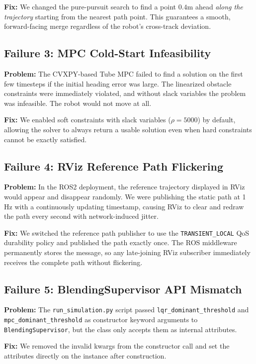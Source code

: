 \documentclass[12pt, a4paper]{article}
\begin{document}
\textbf{Fix:} We changed the pure-pursuit search to find a point $0.4$m ahead \emph{along the trajectory} starting from the nearest path point. This guarantees a smooth, forward-facing merge regardless of the robot's cross-track deviation.

\subsection{Failure 3: MPC Cold-Start Infeasibility}
\textbf{Problem:} The CVXPY-based Tube MPC failed to find a solution on the first few timesteps if the initial heading error was large. The linearized obstacle constraints were immediately violated, and without slack variables the problem was infeasible. The robot would not move at all.

\textbf{Fix:} We enabled soft constraints with slack variables ($\rho = 5000$) by default, allowing the solver to always return a usable solution even when hard constraints cannot be exactly satisfied.

\subsection{Failure 4: RViz Reference Path Flickering}
\textbf{Problem:} In the ROS2 deployment, the reference trajectory displayed in RViz would appear and disappear randomly. We were publishing the static path at 1 Hz with a continuously updating timestamp, causing RViz to clear and redraw the path every second with network-induced jitter.

\textbf{Fix:} We switched the reference path publisher to use the \texttt{TRANSIENT\_LOCAL} QoS durability policy and published the path exactly once. The ROS middleware permanently stores the message, so any late-joining RViz subscriber immediately receives the complete path without flickering.

\subsection{Failure 5: BlendingSupervisor API Mismatch}
\textbf{Problem:} The \texttt{run\_simulation.py} script passed \texttt{lqr\_dominant\_threshold} and \texttt{mpc\_dominant\_threshold} as constructor keyword arguments to \texttt{BlendingSupervisor}, but the class only accepts them as internal attributes.

\textbf{Fix:} We removed the invalid kwargs from the constructor call and set the attributes directly on the instance after construction.
\end{document}
